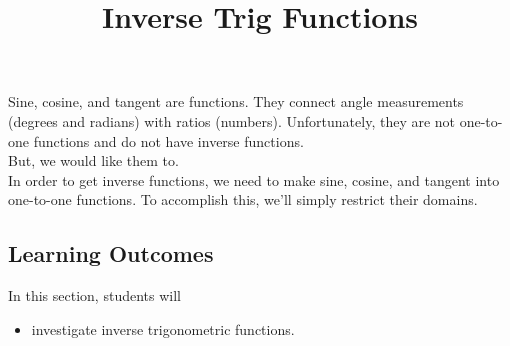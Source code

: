 \documentclass{ximera}
\title{Inverse Trig Functions}
\begin{document}
\begin{abstract}
%
\end{abstract}
\maketitle





Sine, cosine, and tangent are functions. They connect angle measurements (degrees and radians) with ratios (numbers). Unfortunately, they are not one-to-one functions and do not have inverse functions. \\

But, we would like them to.\\

In order to get inverse functions, we need to make sine, cosine, and tangent into one-to-one functions.  To accomplish this, we'll simply restrict their domains.














\subsection{Learning Outcomes}

\begin{sectionOutcomes}
In this section, students will 

\begin{itemize}
\item investigate inverse trigonometric functions.
\end{itemize}
\end{sectionOutcomes}
\end{document}
